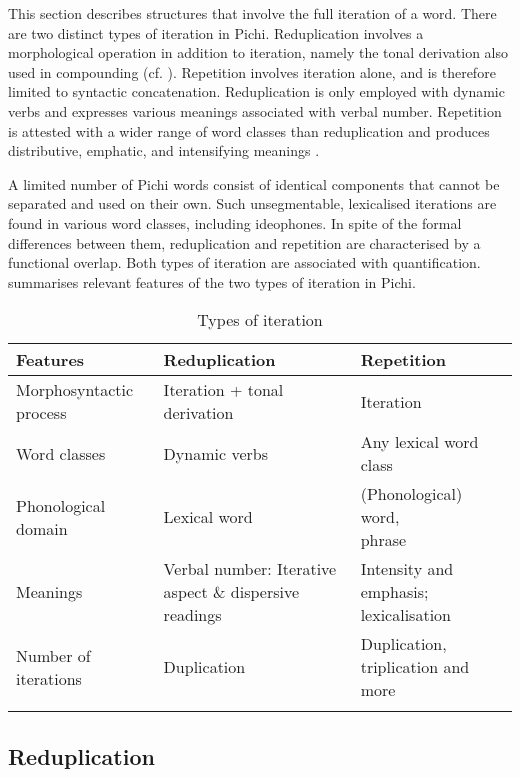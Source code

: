 This section describes structures that involve the full iteration of a word. There are two distinct types of iteration in Pichi. Reduplication involves a morphological operation in addition to iteration, namely the tonal derivation also used in compounding (cf. ). Repetition involves iteration alone, and is therefore limited to syntactic concatenation. Reduplication is only employed with dynamic verbs and expresses various meanings associated with verbal number. Repetition is attested with a wider range of word classes than reduplication and produces distributive, emphatic, and intensifying meanings \citep{Yakpo2012}. 


A limited number of Pichi words consist of identical components that cannot be separated and used on their own. Such unsegmentable, lexicalised iterations are found in various word classes, including ideophones. In spite of the formal differences between them, reduplication and repetition are characterised by a functional overlap. Both types of iteration are associated with quantification.  summarises relevant features of the two types of iteration in Pichi.


\begin{table}
\caption{Types of iteration}
\label{tab:key:4.6}
\small
\begin{tabularx}{\textwidth}{lQp{3.5cm}}
\lsptoprule

Features & Reduplication & Repetition\\
\midrule
Morphosyntactic process & Iteration + tonal derivation & Iteration\\
\tablevspace
Word classes & Dynamic verbs & Any lexical word class\\
\tablevspace
Phonological domain & Lexical word & {(Phonological) word,\newline phrase}\\
\tablevspace
Meanings & Verbal number: Iterative aspect \& dispersive readings & Intensity and emphasis; lexicalisation\\
\tablevspace
Number of iterations & Duplication & Duplication, triplication and more\\
\lspbottomrule
\end{tabularx}
\end{table}
\subsection{Reduplication}\label{sec:4.5.1}

